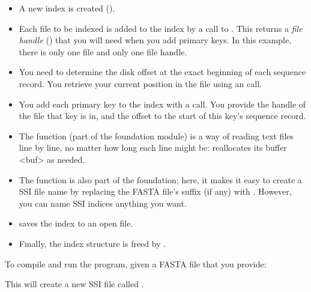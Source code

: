 \begin{itemize}
\item A new index is created ().

\item Each file to be indexed is added to the index by a call to
      . This returns a \emph{file handle}
      () that you will need when you add primary keys. In
      this example, there is only one file and only one file handle.

\item You need to determine the disk offset at the exact beginning of
      each sequence record. You retrieve your current position in the
      file using an  call.

\item You add each primary key to the index with a
       call. You provide the handle of the
      file that key is in, and the offset to the start of this key's
      sequence record.

\item The  function (part of the  
      foundation module) is a way of reading text files line by line, 
      no matter how long each line might be: 
      reallocates its buffer <buf> as needed.

\item The  function is also part of the
       foundation; here, it makes it easy to create a
      SSI file name by replacing the FASTA file's suffix (if any) with
      . However, you can name SSI indices anything you
      want.

\item {} saves the index to an open file.

\item Finally, the index structure is freed by
      .
\end{itemize}

To compile and run the program, given a FASTA file  that
you provide:

\begin{cchunk}
\end{cchunk}

This will create a new SSI file called .


